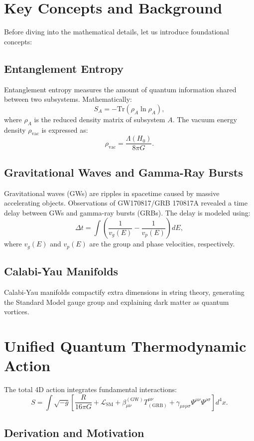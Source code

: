 \documentclass[12pt,a4paper]{article}
\begin{document}
\section{Key Concepts and Background}
Before diving into the mathematical details, let us introduce foundational concepts:

\subsection{Entanglement Entropy}
Entanglement entropy measures the amount of quantum information shared between two subsystems. Mathematically:
\[
S_A = -\text{Tr}(\rho_A \ln \rho_A),
\]
where $\rho_A$ is the reduced density matrix of subsystem $A$. The vacuum energy density $\rho_{\text{vac}}$ is expressed as:
\[
\rho_{\text{vac}} = \frac{\Lambda(H_0)}{8\pi G}.
\]

\subsection{Gravitational Waves and Gamma-Ray Bursts}
Gravitational waves (GWs) are ripples in spacetime caused by massive accelerating objects. Observations of GW170817/GRB 170817A revealed a time delay between GWs and gamma-ray bursts (GRBs). The delay is modeled using:
\[
\Delta t = \int \left( \frac{1}{v_g(E)} - \frac{1}{v_p(E)} \right) dE,
\]
where $v_g(E)$ and $v_p(E)$ are the group and phase velocities, respectively.

\subsection{Calabi-Yau Manifolds}
Calabi-Yau manifolds compactify extra dimensions in string theory, generating the Standard Model gauge group and explaining dark matter as quantum vortices.

\section{Unified Quantum Thermodynamic Action}
The total 4D action integrates fundamental interactions:
\[
S = \int \sqrt{-g} \left[ \frac{R}{16\pi G} + \mathcal{L}_{\text{SM}} + \beta^{(\text{GW})}_{\mu\nu} T^{\mu\nu}_{(\text{GRB})} + \gamma_{\mu\nu\rho\sigma} \Psi^{\mu\nu} \Psi^{\rho\sigma} \right] d^4x.
\]

\subsection{Derivation and Motivation}
\end{document}
